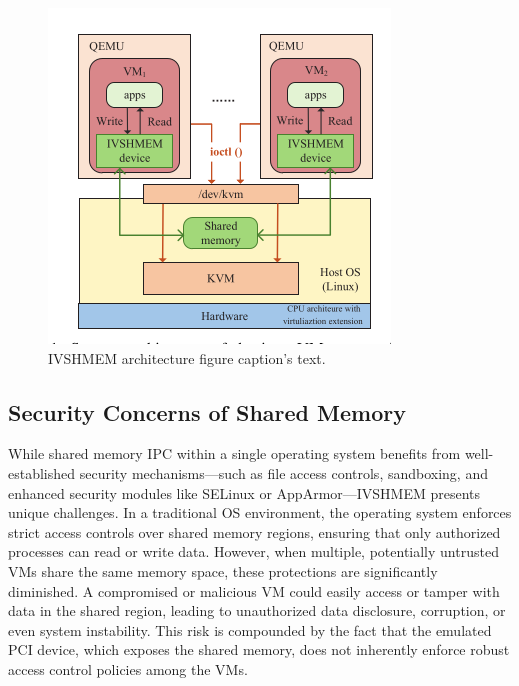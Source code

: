 \documentclass[conference]{IEEEtran}
\begin{document}
\begin{figure}[ht]
  \begin{center}
    \includegraphics[width=0.95\linewidth]{./figures/ivshmem_arch.png}
  \end{center}
  \caption{\label{fig:ivshmem_arch} IVSHMEM architecture figure
    caption's text. }
\end{figure}

\subsection{Security Concerns of Shared Memory}
While shared memory IPC within a single operating system benefits from
well-established security mechanisms—such as file access controls, sandboxing,
and enhanced security modules like SELinux or AppArmor—IVSHMEM presents unique
challenges. In a traditional OS environment, the operating system enforces
strict access controls over shared memory regions, ensuring that only
authorized processes can read or write data. However, when multiple,
potentially untrusted VMs share the same memory space, these protections are
significantly diminished. A compromised or malicious VM could easily access or
tamper with data in the shared region, leading to unauthorized data disclosure,
corruption, or even system instability. This risk is compounded by the fact
that the emulated PCI device, which exposes the shared memory, does not
inherently enforce robust access control policies among the VMs.
\end{document}
